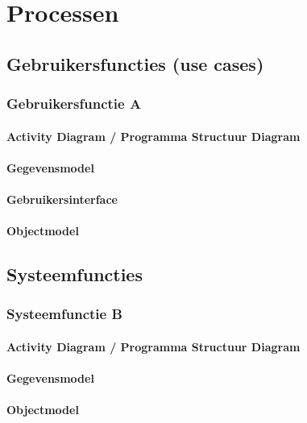 \section{Processen}
\subsection{Gebruikersfuncties (use cases)}
\subsubsection{Gebruikersfunctie A}
\paragraph{Activity Diagram / Programma Structuur Diagram}
\paragraph{Gegevensmodel}
\paragraph{Gebruikersinterface}
\paragraph{Objectmodel}
\subsection{Systeemfuncties}
\subsubsection{Systeemfunctie B}
\paragraph{Activity Diagram / Programma Structuur Diagram}
\paragraph{Gegevensmodel}
\paragraph{Objectmodel}
